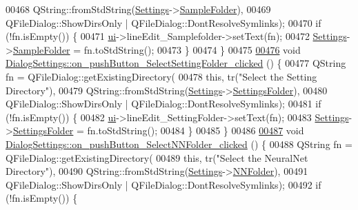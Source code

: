 \begin{DoxyCode}
00468       QString::fromStdString(\hyperlink{class_dialog_settings_ae6b9e42f9108f93c4964be28a7171648}{Settings}->\hyperlink{class_soil_analyzer_1_1_soil_settings_adfd46a349d927988c955fa064fc7bf1a}{SampleFolder}),
00469       QFileDialog::ShowDirsOnly | QFileDialog::DontResolveSymlinks);
00470   \textcolor{keywordflow}{if} (!fn.isEmpty()) \{
00471     \hyperlink{class_dialog_settings_a5b53d91a27cdf68f77e4bdd10b6a9bba}{ui}->lineEdit\_Samplefolder->setText(fn);
00472     \hyperlink{class_dialog_settings_ae6b9e42f9108f93c4964be28a7171648}{Settings}->\hyperlink{class_soil_analyzer_1_1_soil_settings_adfd46a349d927988c955fa064fc7bf1a}{SampleFolder} = fn.toStdString();
00473   \}
00474 \}
00475 
\hypertarget{dialogsettings_8cpp_source_l00476}{}\hyperlink{class_dialog_settings_a1df15a887dc7ab9d9ab3e1914d9db48f}{00476} \textcolor{keywordtype}{void} \hyperlink{class_dialog_settings_a1df15a887dc7ab9d9ab3e1914d9db48f}{DialogSettings::on\_pushButton\_SelectSettingFolder\_clicked}
      () \{
00477   QString fn = QFileDialog::getExistingDirectory(
00478       \textcolor{keyword}{this}, tr(\textcolor{stringliteral}{"Select the Setting Directory"}),
00479       QString::fromStdString(\hyperlink{class_dialog_settings_ae6b9e42f9108f93c4964be28a7171648}{Settings}->\hyperlink{class_soil_analyzer_1_1_soil_settings_a2107a9c59b4b04e1edf148c5d5308d17}{SettingsFolder}),
00480       QFileDialog::ShowDirsOnly | QFileDialog::DontResolveSymlinks);
00481   \textcolor{keywordflow}{if} (!fn.isEmpty()) \{
00482     \hyperlink{class_dialog_settings_a5b53d91a27cdf68f77e4bdd10b6a9bba}{ui}->lineEdit\_SettingFolder->setText(fn);
00483     \hyperlink{class_dialog_settings_ae6b9e42f9108f93c4964be28a7171648}{Settings}->\hyperlink{class_soil_analyzer_1_1_soil_settings_a2107a9c59b4b04e1edf148c5d5308d17}{SettingsFolder} = fn.toStdString();
00484   \}
00485 \}
00486 
\hypertarget{dialogsettings_8cpp_source_l00487}{}\hyperlink{class_dialog_settings_af649aa10d4fa099e855836f93ba7e6ba}{00487} \textcolor{keywordtype}{void} \hyperlink{class_dialog_settings_af649aa10d4fa099e855836f93ba7e6ba}{DialogSettings::on\_pushButton\_SelectNNFolder\_clicked}
      () \{
00488   QString fn = QFileDialog::getExistingDirectory(
00489       \textcolor{keyword}{this}, tr(\textcolor{stringliteral}{"Select the NeuralNet Directory"}),
00490       QString::fromStdString(\hyperlink{class_dialog_settings_ae6b9e42f9108f93c4964be28a7171648}{Settings}->\hyperlink{class_soil_analyzer_1_1_soil_settings_a3c10433119931ebd347fb830c3020f39}{NNFolder}),
00491       QFileDialog::ShowDirsOnly | QFileDialog::DontResolveSymlinks);
00492   \textcolor{keywordflow}{if} (!fn.isEmpty()) \{

\end{DoxyCode}
